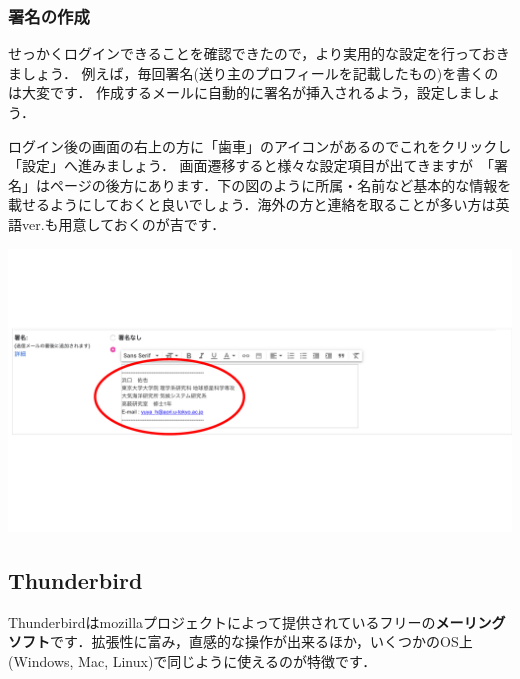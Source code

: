 \documentclass{jarticle}
\begin{document}
\subsubsection{署名の作成}
せっかくログインできることを確認できたので，より実用的な設定を行っておきましょう．
例えば，毎回署名(送り主のプロフィールを記載したもの)を書くのは大変です．
作成するメールに自動的に署名が挿入されるよう，設定しましょう．

ログイン後の画面の右上の方に「歯車」のアイコンがあるのでこれをクリックし「設定」へ進みましょう．
画面遷移すると様々な設定項目が出てきますが\ 「署名」はページの後方にあります．下の図のように所属・名前など基本的な情報を載せるようにしておくと良いでしょう．海外の方と連絡を取ることが多い方は英語ver.も用意しておくのが吉です．

\begin{center}
  \includegraphics[width=140mm,pagebox=cropbox,clip]{fig/shomei.pdf}
\end{center}

\subsection{Thunderbird}
  Thunderbirdはmozillaプロジェクトによって提供されているフリーの{\bf メーリング
  ソフト}です．拡張性に富み，直感的な操作が出来るほか，いくつかのOS上
  (Windows, Mac, Linux)で同じように使えるのが特徴です．
  
\end{document}
